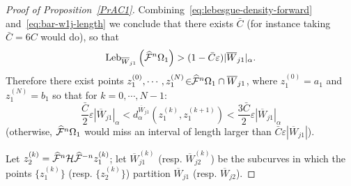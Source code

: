 \documentclass[AHL, Unicode, longabstracts,published]{cedram}
\newcommand{\eps}{\varepsilon}
\newcommand{\cm}{\mathcal{F}}
\newcommand{\hol}{\mathcal{H}}
\newcommand{\cmp}{\hat\cm}
\newcommand{\brW}{\overline{W}}
\newcommand{\dadm}[1]{\dadmPrivate^{#1}}
\newcommand{\dadmPrivate}{d\adm}
\newcommand{\adm}{_{\alpha^{+}}}
\newcommand{\Leb}{\textup{Leb}}
\renewcommand{\adm}{_{\alpha}}
\renewcommand{\dadm}{d\adm}
\let\oldhat\hat
\renewcommand*{\hat}[1]{\mathchoice{\widehat{#1}}{\widehat{#1}}{\oldhat{#1}}{\oldhat{#1}}}
\begin{document}
\begin{proof}[Proof of Proposition~\ref{PrAC1}]
Combining~\eqref{eq:lebesgue-density-forward} and~\eqref{eq:bar-w1j-length} we conclude that there exists $\bar C$ (for instance taking $\bar C = 6C$ would do), so that
\begin{align*}
\Leb_{\brW_{j1}}\left(\cmp^{n}\Omega_{1}\right) > (1-\bar C\eps)|\brW_{j1}|\adm.
\end{align*}
Therefore there exist points $z_{1}^{(0)},\cdots,z_{1}^{(N)}\!\in\!\!\cmp^{n}\Omega_{1}\cap\brW_{j1}$, where $z_{1}^{(0)} = a_{1}$ and $z_{1}^{(N)} = b_{1}$ so that for $k = 0,\cdots, N-1$:
\begin{equation}\label{Dist1}
\frac{\bar C}{2}\eps|\brW_{j1}|\adm < \dadm^{\brW_{j1}}\left(z_1^{(k)},z_1^{(k+1)}\right) <
\frac{3 \bar C}{2}\eps|\brW_{j1}|\adm
\end{equation}
(otherwise, $\cmp^{n}\Omega_{1}$ would miss an interval of length larger than $\bar C\eps|\brW_{j1}|$).

Let $z_{2}^{(k)} = \cmp^{n}\hol\cmp^{-n}z_{1}^{(k)}$; let $\brW_{j1}^{(k)}$ (resp. $\brW_{j2}^{(k)}$) be the subcurves in which the points $\{z_{1}^{(k)}\}$ (resp. $\{z_{2}^{(k)}\}$) partition $\brW_{j1}$ (resp. $\brW_{j2}$).


\end{proof}
\end{document}
